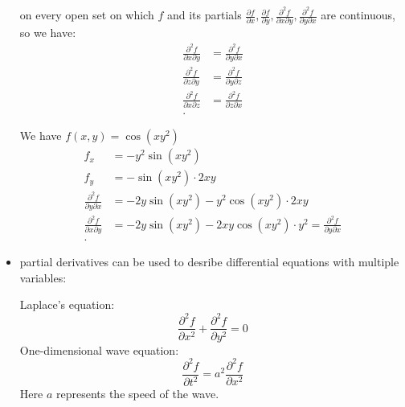 \begin{itemize}
\begin{theorem}
\begin{equation}
			\end{equation}
			on every open set on which $f$ and its partials $\frac{\partial f}{\partial x}, \frac{\partial f}{\partial y}, \frac{\partial ^2f}{\partial x \partial y}, \frac{\partial ^2f}{\partial y \partial x} $ are continuous, so we have:
			\begin{align*}
				\frac{\partial ^2f}{\partial x \partial y}  &= \frac{\partial ^2f}{\partial y \partial x}  \\
				\frac{\partial ^2f}{\partial z \partial y}  &=  \frac{\partial ^2f}{\partial y \partial z}  \\
				\frac{\partial ^2f}{\partial x \partial z} &= \frac{\partial ^2f}{\partial z \partial x}  \\
			.\end{align*}
		\end{theorem}
		\begin{example}
			We have $f\left( x,y \right)  = \cos\left( xy^2 \right) $ 
			\begin{align*}
				f_{x} &= -y^2\sin\left( xy^2 \right)  \\
				f_y &= -\sin\left( xy^2 \right) \cdot 2xy \\
				\frac{\partial ^2f}{\partial y \partial x} &= -2y\sin\left( xy^2 \right)  - y^2\cos\left( xy^2 \right) \cdot 2xy \\
				\frac{\partial ^2f}{\partial x \partial y} &= -2y\sin\left( xy^2 \right) -2xy\cos\left( xy^2 \right) \cdot y^2 = \frac{\partial ^2f}{\partial y \partial x}  \\
			.\end{align*}
		\end{example}
	\item partial derivatives can be used to desribe differential equations with multiple variables:
		\begin{example}
			Laplace's equation:
			\begin{equation}
				\frac{\partial ^2f}{\partial x^2}  + \frac{\partial ^2f}{\partial y^2}=0
			\end{equation}
			One-dimensional wave equation:
			\begin{equation}
				\frac{\partial ^2f}{\partial t^2}  = a^2 \frac{\partial ^2f}{\partial x^2}
			\end{equation}
			Here $a$ represents the speed of the wave.
		\end{example}
\end{itemize}

